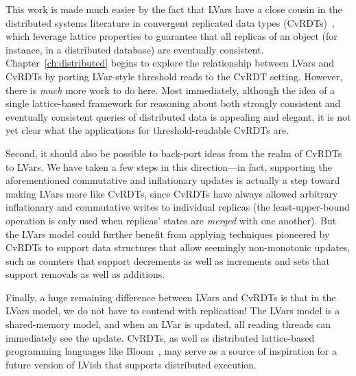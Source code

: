 This work is made much easier by the fact that LVars have a close
cousin in the distributed systems literature in convergent replicated
data types (CvRDTs)~\cite{crdts,crdts-tr}, which leverage lattice
properties to guarantee that all replicas of an object (for instance,
in a distributed database) are eventually consistent.
Chapter~\ref{ch:distributed} begins to explore the relationship
between LVars and CvRDTs by porting LVar-style threshold reads to the
CvRDT setting.  However, there is \emph{much} more work to do here.
Most immediately, although the idea of a single lattice-based
framework for reasoning about both strongly consistent and eventually
consistent queries of distributed data is appealing and elegant, it is
not yet clear what the applications for threshold-readable CvRDTs are.

Second, it should also be possible to back-port ideas from the realm
of CvRDTs to LVars.  We have taken a few steps in this direction---in
fact, supporting the aforementioned commutative and inflationary
updates is actually a step toward making LVars more like CvRDTs, since
CvRDTs have always allowed arbitrary inflationary and commutative
writes to individual replicas (the least-upper-bound operation is only
used when replicas' states are \emph{merged} with one another).  But
the LVars model could further benefit from applying techniques
pioneered by CvRDTs to support data structures that allow seemingly
non-monotonic updates, such as counters that support decrements as
well as increments and sets that support removals as well as
additions.

Finally, a huge remaining difference between LVars and CvRDTs is that
in the LVars model, we do not have to contend with replication!  The
LVars model is a shared-memory model, and when an LVar is updated, all
reading threads can immediately see the update.  CvRDTs, as well as
distributed lattice-based programming languages like
Bloom~\cite{bloom-cidr, blooml}, may serve as a source of inspiration
for a future version of LVish that supports distributed execution.


